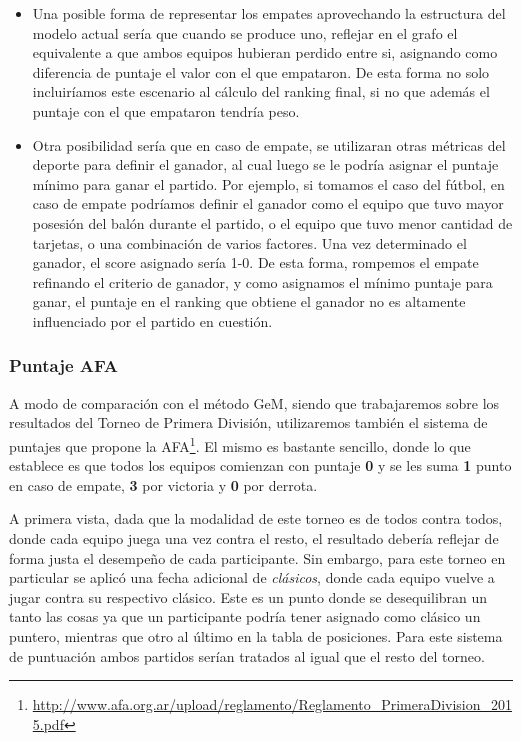 \begin{itemize}
    \item Una posible forma de representar los empates aprovechando la estructura del
        modelo actual sería que cuando se produce uno, reflejar en el grafo el equivalente a
        que ambos equipos hubieran perdido entre si, asignando como diferencia de
        puntaje el valor con el que empataron. De esta forma no solo incluiríamos este
        escenario al cálculo del ranking final, si no que además el puntaje con el que
        empataron tendría peso.
    \item Otra posibilidad sería que en caso de empate, se utilizaran otras métricas
        del deporte para definir el ganador, al cual luego se le podría asignar
        el puntaje mínimo para ganar el partido. Por ejemplo, si tomamos el caso
        del fútbol, en caso de empate podríamos definir el ganador como el equipo
        que tuvo mayor posesión del balón durante el partido, o el equipo que tuvo
        menor cantidad de tarjetas, o una combinación de varios factores. Una vez
        determinado el ganador, el score asignado sería 1-0.
        De esta forma, rompemos el empate refinando el criterio de ganador, y como
        asignamos el mínimo puntaje para ganar, el puntaje en el ranking que obtiene
        el ganador no es altamente influenciado por el partido en cuestión.
\end{itemize}

\subsubsection{Puntaje AFA}

A modo de comparación con el método GeM, siendo que trabajaremos sobre los
resultados del Torneo de Primera División, utilizaremos también el sistema de
puntajes que propone la
AFA\footnote{\url{http://www.afa.org.ar/upload/reglamento/Reglamento\_PrimeraDivision\_2015.pdf}}.
El mismo es bastante sencillo, donde lo que establece es que todos los equipos
comienzan con puntaje \textbf{0} y se les suma \textbf{1} punto en caso de
empate, \textbf{3} por victoria y \textbf{0} por derrota.

A primera vista, dada que la modalidad de este torneo es de todos contra todos,
donde cada equipo juega una vez contra el resto, el resultado debería reflejar
de forma justa el desempeño de cada participante. Sin embargo, para este torneo
en particular se aplicó una fecha adicional de \textit{clásicos}, donde cada
equipo vuelve a jugar contra su respectivo clásico. Este es un punto donde se
desequilibran un tanto las cosas ya que un participante podría tener asignado
como clásico un puntero, mientras que otro al último en la tabla de posiciones.
Para este sistema de puntuación ambos partidos serían tratados al igual que el
resto del torneo.

